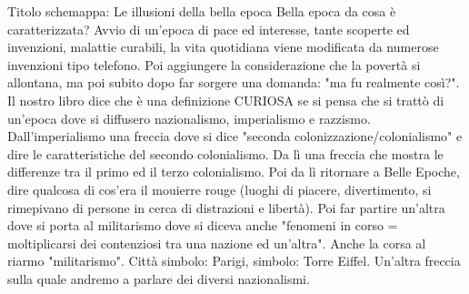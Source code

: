 \documentclass{article}
\begin{document}
    Titolo schemappa: Le illusioni della bella epoca
    Bella epoca da cosa è caratterizzata? Avvio di un'epoca di pace ed interesse, tante scoperte ed invenzioni, malattie curabili, la vita quotidiana viene modificata da numerose invenzioni tipo telefono.
    Poi aggiungere la considerazione che la povertà si allontana, ma poi subito dopo far sorgere una domanda: "ma fu realmente così?". Il nostro libro dice che è una definizione CURIOSA se si pensa che si trattò di un'epoca dove si diffusero nazionalismo, imperialismo e razzismo. Dall'imperialismo una freccia dove si dice "seconda colonizzazione/colonialismo" e dire le caratteristiche del secondo colonialismo. Da lì una freccia che mostra le differenze tra il primo ed il terzo colonialismo.
    Poi da lì ritornare a Belle Epoche, dire qualcosa di cos'era il mouierre rouge (luoghi di piacere, divertimento, si rimepivano di persone in cerca di distrazioni e libertà). Poi far partire un'altra dove si porta al militarismo dove si diceva anche "fenomeni in corso = moltiplicarsi dei contenziosi tra una nazione ed un'altra". Anche la corsa al riarmo "militarismo".
    Città simbolo: Parigi, simbolo: Torre Eiffel.
    Un'altra freccia sulla quale andremo a parlare dei diversi nazionalismi.
\end{document}
